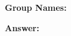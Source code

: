 \documentclass[11pt]{extarticle}
\theoremstyle{definition}\newmdtheoremenv{definition}[theorem]{Definition}
\theoremstyle{plain}
\theoremstyle{remark}\newtheorem{remark}[theorem]{Remark}
\begin{document}


\bigskip

{\bf Group Names:}
 

\vskip100pt

{\bf Answer:}
\end{document}
